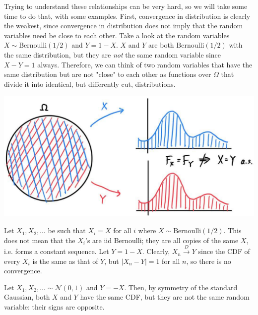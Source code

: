 \documentclass{article}
\begin{document}
    Trying to understand these relationships can be very hard, so we will take some time to do that, with some examples. First, convergence in distribution is clearly the weakest, since convergence in distribution does not imply that the random variables need be close to each other. Take a look at the random variables $X \sim \mathrm{Bernoulli}(1/2)$ and $Y = 1 - X$. $X$ and $Y$ are both $\mathrm{Bernoulli}(1/2)$ with the same distribution, but they are \textit{not} the same random variable since $X - Y = 1$ always. Therefore, we can think of two random variables that have the same distribution but are not "close" to each other as functions over $\Omega$ that divide it into identical, but differently cut, distributions. 
    \begin{center}
      \includegraphics[scale=0.23]{img/prob_in_distribution.jpg}
    \end{center}

    \begin{example}
      Let $X_1, X_2, \ldots$ be such that $X_i = X$ for all $i$ where $X \sim \mathrm{Bernoulli}(1/2)$. This does not mean that the $X_i$'s are iid Bernoulli; they are all copies of the same $X$, i.e. forms a constant sequence. Let $Y = 1 - X$. Clearly, $X_n \xrightarrow{D} Y$ since the CDF of every $X_i$ is the same as that of $Y$, but $|X_n - Y| = 1$ for all $n$, so there is no convergence.  
    \end{example}

    \begin{example}
      Let $X_1, X_2, \ldots \sim \mathcal{N}(0, 1)$ and $Y = -X$. Then, by symmetry of the standard Gaussian, both $X$ and $Y$ have the same CDF, but they are not the same random variable: their signs are opposite. 
    \end{example}
\end{document}
